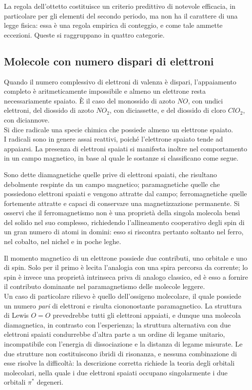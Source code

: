 La regola dell'ottetto costituisce un criterio predittivo di notevole efficacia, in particolare per gli elementi del secondo periodo, ma non ha il carattere di una legge fisica: essa è una regola empirica di conteggio, e come tale ammette eccezioni. Queste si raggruppano in quattro categorie.

\subsection{Molecole con numero dispari di elettroni}

Quando il numero complessivo di elettroni di valenza è dispari, l'appaiamento completo è aritmeticamente impossibile e almeno un elettrone resta necessariamente spaiato. È il caso del monossido di azoto $NO$, con undici elettroni, del diossido di azoto $NO_2$, con diciassette, e del diossido di cloro $ClO_2$, con diciannove.\\

Si dice radicale una specie chimica che possiede almeno un elettrone spaiato.\\

I radicali sono in genere assai reattivi, poiché l'elettrone spaiato tende ad appaiarsi. La presenza di elettroni spaiati si manifesta inoltre nel comportamento in un campo magnetico, in base al quale le sostanze si classificano come segue.

Sono dette diamagnetiche quelle prive di elettroni spaiati, che risultano debolmente respinte da un campo magnetico; paramagnetiche quelle che possiedono elettroni spaiati e vengono attratte dal campo; ferromagnetiche quelle fortemente attratte e capaci di conservare una magnetizzazione permanente. Si osservi che il ferromagnetismo non è una proprietà della singola molecola bensì del solido nel suo complesso, richiedendo l'allineamento cooperativo degli spin di un gran numero di atomi in domini: esso si riscontra pertanto soltanto nel ferro, nel cobalto, nel nichel e in poche leghe.

Il momento magnetico di un elettrone possiede due contributi, uno orbitale e uno di spin. Solo per il primo è lecita l'analogia con una spira percorsa da corrente; lo spin è invece una proprietà intrinseca priva di analogo classico, ed è esso a fornire il contributo dominante nel paramagnetismo delle molecole leggere.\\

Un caso di particolare rilievo è quello dell'ossigeno molecolare, il quale possiede un numero \emph{pari} di elettroni e risulta ciononostante paramagnetico. La struttura di Lewis $O=O$ prevedrebbe tutti gli elettroni appaiati, e dunque una molecola diamagnetica, in contrasto con l'esperienza; la struttura alternativa con due elettroni spaiati condurrebbe d'altra parte a un ordine di legame unitario, incompatibile con l'energia di dissociazione e la distanza di legame misurate. Le due strutture non costituiscono ibridi di risonanza, e nessuna combinazione di esse risolve la difficoltà: la descrizione corretta richiede la teoria degli orbitali molecolari, nella quale i due elettroni spaiati occupano singolarmente i due orbitali $\pi^*$ degeneri.

